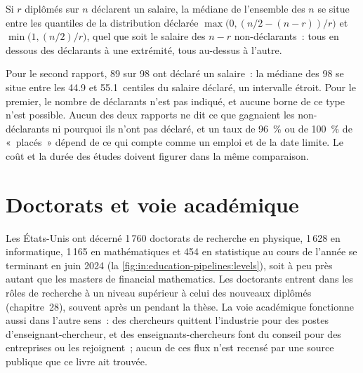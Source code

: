 \begin{method}\label{met:in:education-pipelines:bounds}
Si $r$ diplômés sur $n$ déclarent un salaire, la médiane de l'ensemble des $n$ se situe entre les quantiles de la distribution déclarée
$\max\bigl(0,(n/2-(n-r))/r\bigr)$ et $\min\bigl(1,(n/2)/r\bigr)$, quel que soit le salaire des $n-r$ non-déclarants~: tous en dessous des
déclarants à une extrémité, tous au-dessus à l'autre.
\end{method}

Pour le second rapport, 89 sur 98 ont déclaré un salaire~: la médiane des 98 se situe entre les 44.9 et 55.1~centiles du salaire
déclaré, un intervalle étroit. Pour le premier, le nombre de déclarants n'est pas indiqué, et aucune borne de ce type n'est possible. Aucun des deux
rapports ne dit ce que gagnaient les non-déclarants ni pourquoi ils n'ont pas déclaré, et un taux de 96~\% ou de 100~\% de «~placés~» dépend de ce
qui compte comme un emploi et de la date limite. Le coût et la durée des études doivent figurer dans la même comparaison.

\section{Doctorats et voie académique}

Les États-Unis ont décerné 1\,760 doctorats de recherche en physique, 1\,628 en informatique, 1\,165 en mathématiques et 454 en
statistique au cours de l'année se terminant en juin 2024 (la \cref{fig:in:education-pipelines:levels}), soit à peu près autant que les masters de
financial mathematics. Les doctorants entrent dans les rôles de recherche à un niveau supérieur à celui des nouveaux diplômés (chapitre~28), souvent
après un  pendant la thèse. La voie académique fonctionne aussi dans l'autre sens~: des chercheurs quittent l'industrie pour des postes d'enseignant-chercheur,
et des enseignants-chercheurs font du conseil pour des entreprises ou les rejoignent~; aucun de ces flux n'est recensé par une source publique
que ce livre ait trouvée.

